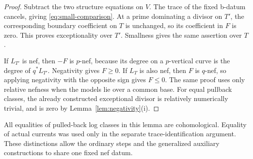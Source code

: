 \begin{proof}
Subtract the two structure equations on $V$.  The trace of the fixed
b-datum cancels, giving \eqref{eq:small-comparison}.  At a prime
dominating a divisor on $T'$, the corresponding boundary coefficient
on $T$ is unchanged, so its coefficient in $F$ is zero.  This proves
exceptionality over $T'$.  Smallness gives the same assertion over
$T$.

If $L_{T'}$ is nef, then $-F$ is $p$-nef, because its degree on a
$p$-vertical curve is the degree of $q^*L_{T'}$.  Negativity gives
$F\geq0$.  If $L_T$ is also nef, then $F$ is $q$-nef, so applying
negativity with the opposite sign gives $F\leq0$.  The same proof
uses only relative nefness when the models lie over a common base.
For equal pullback classes, the already constructed exceptional
divisor is relatively numerically trivial, and is zero by
Lemma~\ref{lem:negativity}(i).
\end{proof}

All equalities of pulled-back log classes in this lemma are
cohomological.  Equality of actual currents was used only in the
separate trace-identification argument.  These distinctions allow
the ordinary steps and the generalized auxiliary constructions to
share one fixed nef datum.
